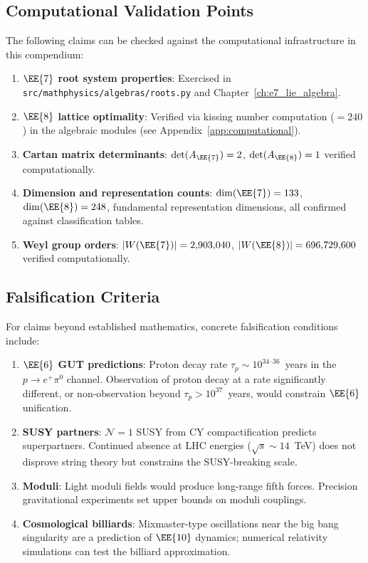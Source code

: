 \subsection{Computational Validation Points}

The following claims can be checked against the computational infrastructure
in this compendium:
\begin{enumerate}
    \item \textbf{$\EE{7}$ root system properties}:
          Exercised in \texttt{src/mathphysics/algebras/roots.py}
          and Chapter~\ref{ch:e7_lie_algebra}.
    \item \textbf{$\EE{8}$ lattice optimality}: Verified via kissing
          number computation ($=240$) in the algebraic modules
          (see Appendix~\ref{app:computational}).
    \item \textbf{Cartan matrix determinants}: $\det(A_{\EE{7}}) = 2$,
          $\det(A_{\EE{8}}) = 1$ verified computationally.
    \item \textbf{Dimension and representation counts}: $\dim(\EE{7}) = 133$,
          $\dim(\EE{8}) = 248$, fundamental representation dimensions,
          all confirmed against classification tables.
    \item \textbf{Weyl group orders}: $|W(\EE{7})| = 2{,}903{,}040$,
          $|W(\EE{8})| = 696{,}729{,}600$ verified computationally.
\end{enumerate}

\subsection{Falsification Criteria}

For claims beyond established mathematics, concrete falsification conditions
include:
\begin{enumerate}
    \item \textbf{$\EE{6}$ GUT predictions}: Proton decay rate
          $\tau_p \sim 10^{34\text{--}36}$~years in the
          $p \to e^+ \pi^0$ channel.  Observation of proton decay at a
          rate significantly different, or non-observation beyond
          $\tau_p > 10^{37}$~years, would constrain $\EE{6}$ unification.
    \item \textbf{SUSY partners}: $\mathcal{N}=1$ SUSY from CY
          compactification predicts superpartners.  Continued absence at
          LHC energies ($\sqrt{s} \sim 14$~TeV) does not disprove
          string theory but constrains the SUSY-breaking scale.
    \item \textbf{Moduli}: Light moduli fields would produce long-range
          fifth forces.  Precision gravitational experiments set upper
          bounds on moduli couplings.
    \item \textbf{Cosmological billiards}: Mixmaster-type oscillations
          near the big bang singularity are a prediction of $\EE{10}$
          dynamics; numerical relativity simulations can test the
          billiard approximation.
\end{enumerate}

